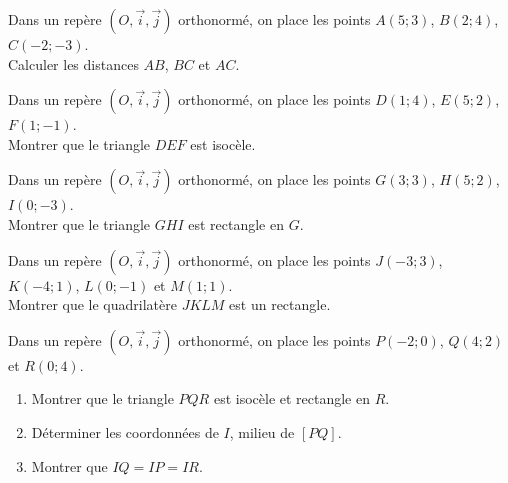 {\begin{Exercice}
Dans un repère \((O,\vec{i},\vec{j})\) orthonormé, on place les points \(A(5;3)\), \(B(2;4)\), \(C(-2;-3)\). \\
Calculer les distances \(AB\), \(BC\) et \(AC\).
\end{Exercice}

\begin{Exercice}
Dans un repère \((O,\vec{i},\vec{j})\) orthonormé, on place les points \(D(1;4)\), \(E(5;2)\), \(F(1;-1)\). \\
Montrer que le triangle \(DEF\) est isocèle.
\end{Exercice}

\begin{Exercice}
Dans un repère \((O,\vec{i},\vec{j})\) orthonormé, on place les points \(G(3;3)\), \(H(5;2)\), \(I(0;-3)\). \\
Montrer que le triangle \(GHI\) est rectangle en \(G\).
\end{Exercice}

\begin{Exercice}
Dans un repère \((O,\vec{i},\vec{j})\) orthonormé, on place les points \(J(-3;3)\), \(K(-4;1)\), \(L(0;-1)\) et \(M(1;1)\).\\
 Montrer que le quadrilatère \(JKLM\) est un rectangle.
\end{Exercice}

\begin{Exercice}
Dans un repère \((O,\vec{i},\vec{j})\) orthonormé, on place les points \(P(-2;0)\), \(Q(4;2)\) et \(R(0;4)\).

\begin{enumerate}
    \item Montrer que le triangle \(PQR\) est isocèle et rectangle en \(R\).
    \item Déterminer les coordonnées de \(I\), milieu de \([PQ]\).
    \item Montrer que \(IQ = IP = IR\).
\end{enumerate}
\end{Exercice}


}
